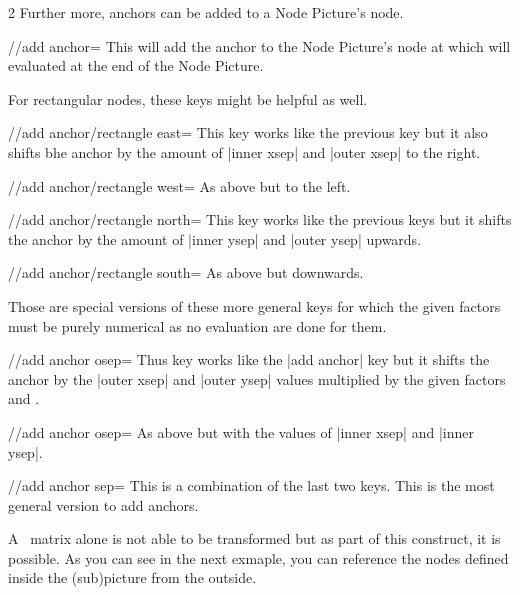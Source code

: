 \begin{multicols*}{2}
Further more, anchors can be added to a Node Picture's node.
\begin{key}{/\tikzextnp/add anchor=}
  This will add the anchor  to the Node Picture's node at 
  which will evaluated at the end of the Node Picture.
\end{key}
For rectangular nodes, these keys might be helpful as well.
\begin{key}{/\tikzextnp/add anchor/rectangle east=}
  This key works like the previous key but it also shifts
  bhe anchor by the amount of |inner xsep| and |outer xsep| to the right.
\end{key}
\begin{key}{/\tikzextnp/add anchor/rectangle west=}
  As above but to the left.
\end{key}
\begin{key}{/\tikzextnp/add anchor/rectangle north=}
  This key works like the previous keys but it shifts
  the anchor by the amount of |inner ysep| and |outer ysep| upwards.
\end{key}
\begin{key}{/\tikzextnp/add anchor/rectangle south=}
  As above but downwards.
\end{key}
Those are special versions of these more general keys
for which the given factors must be purely numerical as no evaluation are done for them.
\begin{key}{/\tikzextnp/add anchor osep=}
  Thus key works like the |add anchor| key but it shifts the anchor by the |outer xsep| and |outer ysep| values
  multiplied by the given factors  and .
\end{key}
\begin{key}{/\tikzextnp/add anchor osep=}
  As above but with the values of |inner xsep| and |inner ysep|.
\end{key}
\begin{key}{/\tikzextnp/add anchor sep=}
  This is a combination of the last two keys.
  This is the most general version to add anchors.
\end{key}

A \pgfname\ matrix alone is not able to be transformed but
as part of this construct, it is possible.
As you can see in the next exmaple,
you can reference the nodes defined inside the (sub)picture
from the outside.


\end{multicols*}
